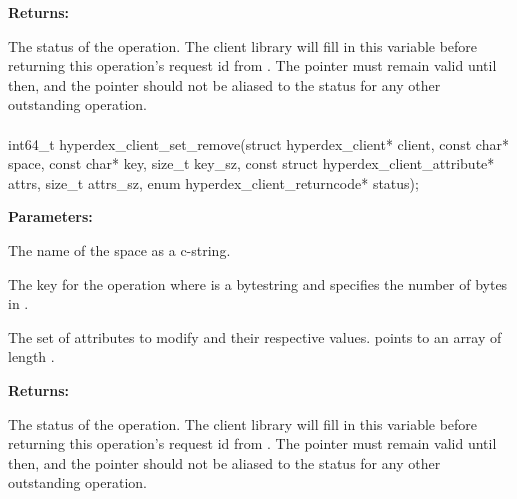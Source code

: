 \noindent\textbf{Returns:}
\begin{description}[labelindent=\widthof{{\code{status}}},leftmargin=*,noitemsep,nolistsep,align=right]
\item[\code{status}] The status of the operation.  The client library will fill in this variable before returning this operation's request id from .  The pointer must remain valid until then, and the pointer should not be aliased to the status for any other outstanding operation.
\end{description}

\paragraph{}
\label{api:c:set_remove}
\begin{ccode}
int64_t hyperdex_client_set_remove(struct hyperdex_client* client,
        const char* space,
        const char* key, size_t key_sz,
        const struct hyperdex_client_attribute* attrs, size_t attrs_sz,
        enum hyperdex_client_returncode* status);
\end{ccode}
\funcdesc 

\noindent\textbf{Parameters:}
\begin{description}[labelindent=\widthof{{\code{attrs}, \code{attrs\_sz}}},leftmargin=*,noitemsep,nolistsep,align=right]
\item[\code{space}] The name of the space as a c-string.
\item[\code{key}, \code{key\_sz}] The key for the operation where  is a bytestring and  specifies the number of bytes in .
\item[\code{attrs}, \code{attrs\_sz}] The set of attributes to modify and their respective values.   points to an array of length .
\end{description}

\noindent\textbf{Returns:}
\begin{description}[labelindent=\widthof{{\code{status}}},leftmargin=*,noitemsep,nolistsep,align=right]
\item[\code{status}] The status of the operation.  The client library will fill in this variable before returning this operation's request id from .  The pointer must remain valid until then, and the pointer should not be aliased to the status for any other outstanding operation.
\end{description}

